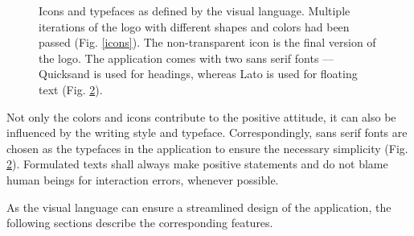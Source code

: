 \documentclass[12pt,numbers=noenddot,parskip,bibliography=totocnumbered,listof=totocnumbered,draft]{scrreprt}
\begin{document}
\begin{figure}
\begin{subfigure}[t]{0.45\textwidth}
\caption{}
\label{fonts}
\end{subfigure}%
\caption[Icons and typefaces]{Icons and typefaces as defined by the visual language. Multiple iterations of the logo with different shapes and colors had been passed (Fig. \ref{icons}). The non-transparent icon is the final version of the logo. The application comes with two sans serif fonts — Quicksand is used for headings, whereas Lato is used for floating text (Fig. \ref{fonts}).}
\end{figure}

Not only the colors and icons contribute to the positive attitude, it can also be influenced by the writing style and typeface. Correspondingly, sans serif fonts are chosen as the typefaces in the application to ensure the necessary simplicity (Fig. \ref{fonts}). Formulated texts shall always make positive statements and do not blame human beings for interaction errors, whenever possible.

As the visual language can ensure a streamlined design of the application, the following sections describe the corresponding features.
\end{document}
